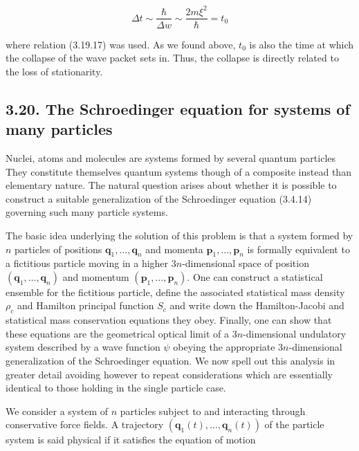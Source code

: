 \documentclass{article}
\begin{document}
\begin{equation*}
\Delta t \sim \frac{\hbar}{\Delta w} \sim \frac{2 m \xi^{2}}{\hbar}=t_{0} \tag{3.19.43}
\end{equation*}
 
where relation (3.19.17) was used. As we found above, $t_{0}$ is also the time at which the collapse of the wave packet sets in. Thus, the collapse is directly related to the loss of stationarity.

\subsection*{3.20. The Schroedinger equation for systems of many particles}

Nuclei, atoms and molecules are systems formed by several quantum particles They constitute themselves quantum systems though of a composite instead than elementary nature. The natural question arises about whether it is possible to construct a suitable generalization of the Schroedinger equation (3.4.14) governing such many particle systems.

The basic idea underlying the solution of this problem is that a system formed by $n$ particles of positions $\boldsymbol{q}_{1}, \ldots, \boldsymbol{q}_{n}$ and momenta $\boldsymbol{p}_{1}, \ldots, \boldsymbol{p}_{n}$ is formally equivalent to a fictitious particle moving in a higher $3 n$-dimensional space of position $\left(\boldsymbol{q}_{1}, \ldots, \boldsymbol{q}_{n}\right)$ and momentum $\left(\boldsymbol{p}_{1}, \ldots, \boldsymbol{p}_{n}\right)$. One can construct a statistical ensemble for the fictitious particle, define the associated statistical mass density $\rho_{c}$ and Hamilton principal function $S_{c}$ and write down the Hamilton-Jacobi and statistical mass conservation equations they obey. Finally, one can show that these equations are the geometrical optical limit of a $3 n$-dimensional undulatory system described by a wave function $\psi$ obeying the appropriate $3 n$-dimensional generalization of the Schroedinger equation. We now spell out this analysis in greater detail avoiding however to repeat considerations which are essentially identical to those holding in the single particle case.

We consider a system of $n$ particles subject to and interacting through conservative force fields. A trajectory $\left(\boldsymbol{q}_{1}(t), \ldots, \boldsymbol{q}_{n}(t)\right)$ of the particle system is said physical if it satisfies the equation of motion
 
\end{document}
